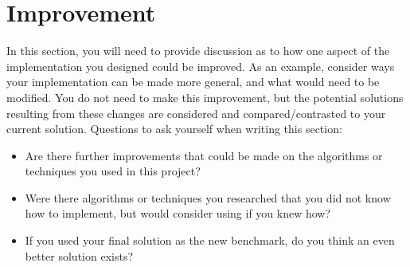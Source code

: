 \documentclass[twoside,openright,titlepage,numbers=noenddot,headinclude,%
               footinclude=true,cleardoublepage=empty,abstractoff,BCOR=5mm,%
               paper=a4,fontsize=11pt,ngerman,american]{scrreprt}
\numberwithin{theorem}{chapter}
\numberwithin{definition}{chapter}
\numberwithin{algorithm}{chapter}
\numberwithin{figure}{chapter}
\numberwithin{table}{chapter}
\numberwithin{equation}{chapter}
\begin{document}
\section*{Improvement}
In this section, you will need to provide discussion as to how one aspect of the implementation you designed could be improved. As an example, consider ways your implementation can be made more general, and what would need to be modified. You do not need to make this improvement, but the potential solutions resulting from these changes are considered and compared/contrasted to your current solution. Questions to ask yourself when writing this section:
\begin{itemize}%
\item Are there further improvements that could be made on the algorithms or techniques you used in this project?
\item Were there algorithms or techniques you researched that you did not know how to implement, but would consider using if you knew how?
\item If you used your final solution as the new benchmark, do you think an even better solution exists?
\end{itemize}
\end{document}
